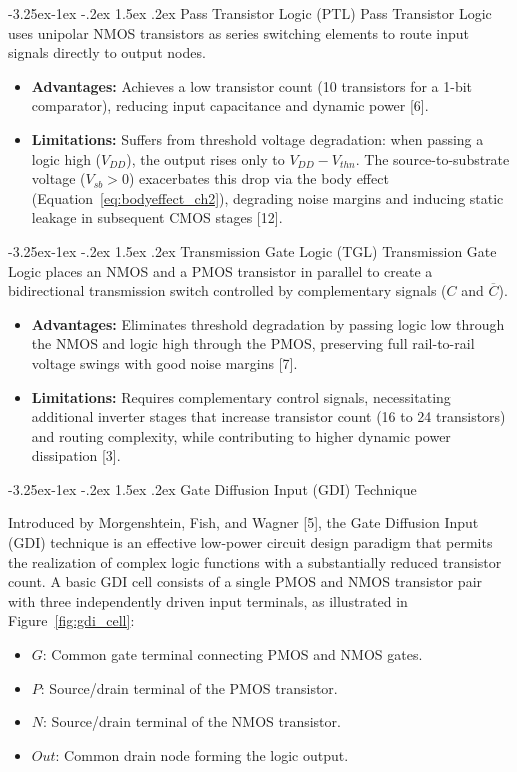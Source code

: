 \documentclass[12pt,a4paper,oneside]{report}
\makeatletter
\renewcommand\subsection{\@startsection{subsection}{2}{\z@}%
                                     {-3.25ex\@plus -1ex \@minus -.2ex}%
                                     {1.5ex \@plus .2ex}%
                                     {\normalfont\normalsize\bfseries\itshape}}
\makeatother
\begin{document}
\subsection{Pass Transistor Logic (PTL)}
Pass Transistor Logic uses unipolar NMOS transistors as series switching elements to route input signals directly to output nodes.
\begin{itemize}
\item \textbf{Advantages:} Achieves a low transistor count (10 transistors for a 1-bit comparator), reducing input capacitance and dynamic power [6].
\item \textbf{Limitations:} Suffers from threshold voltage degradation: when passing a logic high ($V_{DD}$), the output rises only to $V_{DD} - V_{thn}$. The source-to-substrate voltage ($V_{sb} > 0$) exacerbates this drop via the body effect (Equation~\ref{eq:bodyeffect_ch2}), degrading noise margins and inducing static leakage in subsequent CMOS stages [12].
\end{itemize}

\subsection{Transmission Gate Logic (TGL)}
Transmission Gate Logic places an NMOS and a PMOS transistor in parallel to create a bidirectional transmission switch controlled by complementary signals ($C$ and $\overline{C}$).
\begin{itemize}
\item \textbf{Advantages:} Eliminates threshold degradation by passing logic low through the NMOS and logic high through the PMOS, preserving full rail-to-rail voltage swings with good noise margins [7].
\item \textbf{Limitations:} Requires complementary control signals, necessitating additional inverter stages that increase transistor count (16 to 24 transistors) and routing complexity, while contributing to higher dynamic power dissipation [3].
\end{itemize}

\subsection{Gate Diffusion Input (GDI) Technique}

Introduced by Morgenshtein, Fish, and Wagner [5], the Gate Diffusion Input (GDI) technique is an effective low-power circuit design paradigm that permits the realization of complex logic functions with a substantially reduced transistor count. A basic GDI cell consists of a single PMOS and NMOS transistor pair with three independently driven input terminals, as illustrated in Figure~\ref{fig:gdi_cell}:
\begin{itemize}
\item $G$: Common gate terminal connecting PMOS and NMOS gates.
\item $P$: Source/drain terminal of the PMOS transistor.
\item $N$: Source/drain terminal of the NMOS transistor.
\item $Out$: Common drain node forming the logic output.
\end{itemize}
\end{document}
